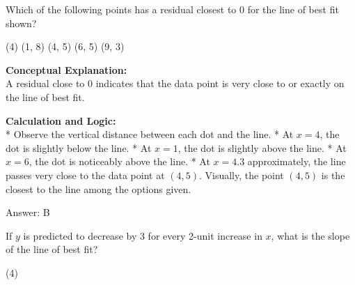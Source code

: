 \documentclass[11pt,paper=a4,answers]{exam}
\begin{document}
\begin{questions}
\question
\begin{center}
\end{center}
Which of the following points has a residual closest to 0 for the line of best fit shown?
\begin{tasks}(4)
    \task (1, 8)
    \task (4, 5)
    \task (6, 5)
    \task (9, 3)
\end{tasks}

\begin{solution}
\textbf{Conceptual Explanation:} \\
A residual close to 0 indicates that the data point is very close to or exactly on the line of best fit.

\vspace{30pt}

\textbf{Calculation and Logic:} \\
* Observe the vertical distance between each dot and the line.
* At $x = 4$, the dot is slightly below the line.
* At $x = 1$, the dot is slightly above the line.
* At $x = 6$, the dot is noticeably above the line.
* At $x = 4.3$ approximately, the line passes very close to the data point at $(4, 5)$. Visually, the point $(4,5)$ is the closest to the line among the options given.

\vspace{30pt}

Answer: \colorbox{yellow!100}{B}
\end{solution}

\vspace{60pt}

\question
If $y$ is predicted to decrease by 3 for every 2-unit increase in $x$, what is the slope of the line of best fit?
\begin{tasks}(4)
\end{tasks}


\end{questions}
\end{document}
